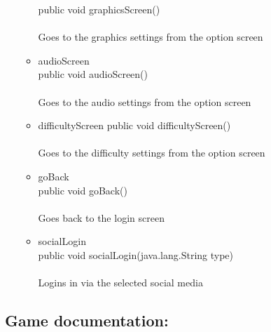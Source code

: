 \documentclass[letterpaper]{article}
\begin{document}
\begin{itemize}
\begin{itemize}
										public void graphicsScreen() \\ \\
										Goes to the graphics settings from the option screen
								\item	audioScreen \\
										public void audioScreen() \\ \\
										Goes to the audio settings from the option screen
								\item	difficultyScreen
										public void difficultyScreen() \\ \\
										Goes to the difficulty settings from the option screen
								\item	goBack \\
										public void goBack() \\ \\
										Goes back to the login screen
								\item	socialLogin \\
										public void socialLogin(java.lang.String type) \\ \\
										Logins in via the selected social media
							\end{itemize}
				\end{itemize}
				
			\vspace{0.2in}
			\subsection*{Game documentation:}
			\vspace{0.1in}
			
\end{document}
